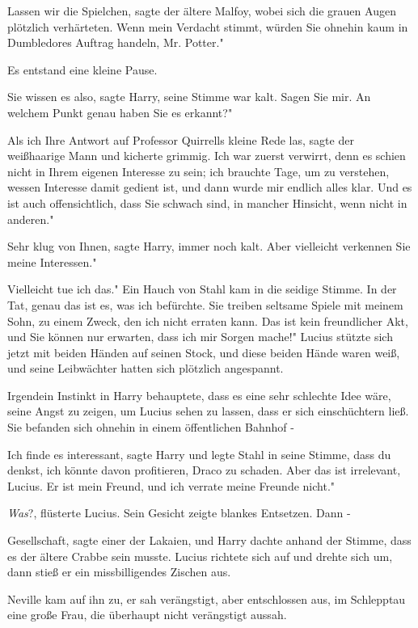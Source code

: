 \glqq{}Lassen wir die Spielchen\grqq{}, sagte der ältere Malfoy, wobei sich die
grauen Augen plötzlich verhärteten. \glqq{}Wenn mein Verdacht stimmt, würden Sie
ohnehin kaum in Dumbledores Auftrag handeln, Mr. Potter."

Es entstand eine kleine Pause.

\glqq{}Sie wissen es also\grqq{}, sagte Harry, seine Stimme war kalt.
\glqq{}Sagen Sie mir. An welchem Punkt genau haben Sie es erkannt?"

\glqq{}Als ich Ihre Antwort auf Professor Quirrells kleine Rede las\grqq{},
sagte der weißhaarige Mann und kicherte grimmig. \glqq{}Ich war zuerst verwirrt,
denn es schien nicht in Ihrem eigenen Interesse zu sein; ich brauchte Tage, um
zu verstehen, wessen Interesse damit gedient ist, und dann wurde mir endlich
alles klar. Und es ist auch offensichtlich, dass Sie schwach sind, in mancher
Hinsicht, wenn nicht in anderen."

\glqq{}Sehr klug von Ihnen\grqq{}, sagte Harry, immer noch kalt. \glqq{}Aber
vielleicht verkennen Sie meine Interessen."

\glqq{}Vielleicht tue ich das." Ein Hauch von Stahl kam in die seidige Stimme.
\glqq{}In der Tat, genau das ist es, was ich befürchte. Sie treiben seltsame
Spiele mit meinem Sohn, zu einem Zweck, den ich nicht erraten kann. Das ist kein
freundlicher Akt, und Sie können nur erwarten, dass ich mir Sorgen mache!"
Lucius stützte sich jetzt mit beiden Händen auf seinen Stock, und diese beiden
Hände waren weiß, und seine Leibwächter hatten sich plötzlich angespannt.

Irgendein Instinkt in Harry behauptete, dass es eine sehr schlechte Idee wäre,
seine Angst zu zeigen, um Lucius sehen zu lassen, dass er sich einschüchtern
ließ. Sie befanden sich ohnehin in einem öffentlichen Bahnhof -

\glqq{}Ich finde es interessant\grqq{}, sagte Harry und legte Stahl in seine
Stimme, \glqq{}dass du denkst, ich könnte davon profitieren, Draco zu schaden.
Aber das ist irrelevant, Lucius. Er ist mein Freund, und ich verrate meine
Freunde nicht."

\glqq{}\emph{Was}?\grqq{}, flüsterte Lucius. Sein Gesicht zeigte blankes
Entsetzen. Dann -

\glqq{}Gesellschaft\grqq{}, sagte einer der Lakaien, und Harry dachte anhand der
Stimme, dass es der ältere Crabbe sein musste. Lucius richtete sich auf und
drehte sich um, dann stieß er ein missbilligendes Zischen aus.

Neville kam auf ihn zu, er sah verängstigt, aber entschlossen aus, im Schlepptau
eine große Frau, die überhaupt nicht verängstigt aussah.

